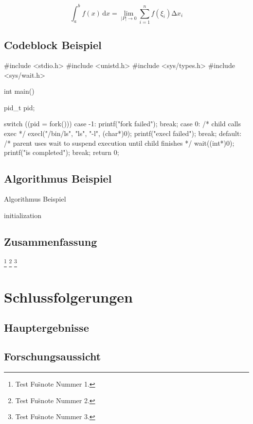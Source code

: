\begin{equation}
  \int_{a}^b f(x)\,\mathrm{d}x=\lim_{|P|\rightarrow 0}\sum_{i=1}^n f(\xi_i)\increment x_i
\end{equation}

\section{Codeblock Beispiel}

\begin{codeblock}[language=C]
#include <stdio.h>
#include <unistd.h>
#include <sys/types.h>
#include <sys/wait.h>

int main() {
  pid_t pid;

  switch ((pid = fork())) {
  case -1:
    printf("fork failed\n");
    break;
  case 0:
    /* child calls exec */
    execl("/bin/ls", "ls", "-l", (char*)0);
    printf("execl failed\n");
    break;
  default:
    /* parent uses wait to suspend execution until child finishes */
    wait((int*)0);
    printf("is completed\n");
    break;
  }
  return 0;
}
\end{codeblock}

\section{Algorithmus Beispiel}

\begin{algorithm}[htb]
  \caption{Algorithmus Beispiel}
  \label{algo:algorithm}
  \small
  \SetAlgoLined

  initialization\;
\end{algorithm}

\section{Zusammenfassung}

\blindtext[8]
\footnote{Test Fu\"snote Nummer 1.}
\footnote{Test Fu\"snote Nummer 2.}
\footnote{Test Fu\"snote Nummer 3.}

\chapter{Schlussfolgerungen}

\section{Hauptergebnisse}

\blindtext[9]

\section{Forschungsaussicht}

\blindtext[10]

